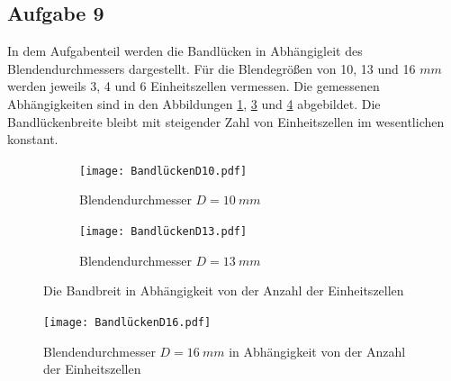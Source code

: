 \subsection{Aufgabe 9}
In dem Aufgabenteil werden die Bandlücken in Abhängigleit des Blendendurchmessers dargestellt.
Für die Blendegrößen von 10, 13 und 16 $\si{mm}$ werden jeweils 3, 4 und 6 Einheitszellen vermessen.
Die gemessenen Abhängigkeiten sind in den Abbildungen \ref{fig.Aufgabe9}, \ref{fig.Aufgabe91} und \ref{fig.Aufgabe92} abgebildet.
Die Bandlückenbreite bleibt mit steigender Zahl von Einheitszellen im wesentlichen konstant.
  \begin{figure}
   \centering
   \begin{subfigure}{0.48\textwidth}
    \centering
    \texttt{[image: BandlückenD10.pdf]}
    \caption{Blendendurchmesser $D=\SI{10}{mm}$}
    \label{fig.Aufgabe9}
   \end{subfigure}
   \begin{subfigure}{0.48\textwidth}
    \centering
    \texttt{[image: BandlückenD13.pdf]}
    \caption{Blendendurchmesser $D=\SI{13}{mm}$}
    \label{fig.Aufgabe91}
   \end{subfigure}
   \caption{Die Bandbreit in Abhängigkeit von der Anzahl der Einheitszellen}
  \end{figure}
  \begin{figure}[h!]
    \centering
    \texttt{[image: BandlückenD16.pdf]}
    \caption{Blendendurchmesser $D=\SI{16}{mm}$ in Abhängigkeit von der Anzahl der Einheitszellen}
    \label{fig.Aufgabe92}
  \end{figure}
  \FloatBarrier

